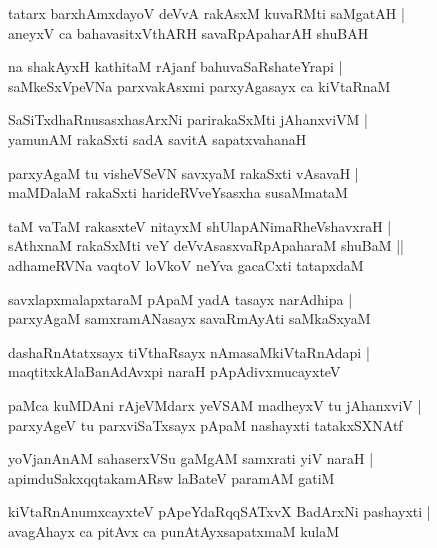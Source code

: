 \documentclass[twoside,12pt,openright]{book}
\newcounter{shloka}[chapter]
\begin{document}
\begin{shloka}
tatarx barxhAmxdayoV deVvA rakAsxM kuvaRMti saMgatAH |\\
aneyxV ca bahavasitxVthARH savaRpApaharAH shuBAH 
\end{shloka}

\begin{shloka}
na shakAyxH kathitaM rAjanf bahuvaSaRshateYrapi |\\
saMkeSxVpeVNa parxvakAsxmi parxyAgasayx ca kiVtaRnaM 
\end{shloka}

\begin{shloka}
SaSiTxdhaRnusasxhasArxNi parirakaSxMti jAhanxviVM |\\
yamunAM rakaSxti sadA savitA sapatxvahanaH 
\end{shloka}

\begin{shloka}
parxyAgaM tu visheVSeVN savxyaM rakaSxti vAsavaH |\\
maMDalaM rakaSxti harideRVveYsasxha susaMmataM 
\end{shloka}

\begin{shloka}
taM vaTaM rakasxteV nitayxM shUlapANimaRheVshavxraH |\\
sAthxnaM rakaSxMti veY deVvAsasxvaRpApaharaM shuBaM ||\\
adhameRVNa vaqtoV loVkoV neYva gacaCxti tatapxdaM 
\end{shloka}

\begin{shloka}
savxlapxmalapxtaraM pApaM yadA tasayx narAdhipa |\\
parxyAgaM samxramANasayx savaRmAyAti saMkaSxyaM 
\end{shloka}

\begin{shloka}
dashaRnAtatxsayx tiVthaRsayx nAmasaMkiVtaRnAdapi |\\
maqtitxkAlaBanAdAvxpi naraH pApAdivxmucayxteV 
\end{shloka}

\begin{shloka}
paMca kuMDAni rAjeVMdarx yeVSAM madheyxV tu jAhanxviV |\\
parxyAgeV tu parxviSaTxsayx pApaM nashayxti tatakxSXNAtf 
\end{shloka}

\begin{shloka}
yoVjanAnAM sahaserxVSu gaMgAM samxrati yiV naraH |\\
apimduSakxqqtakamARsw laBateV paramAM gatiM 
\end{shloka}
\begin{shloka}
kiVtaRnAnumxcayxteV pApeYdaRqqSATxvX BadArxNi pashayxti |\\
avagAhayx ca pitAvx ca punAtAyxsapatxmaM kulaM 
\end{shloka}
\end{document}
